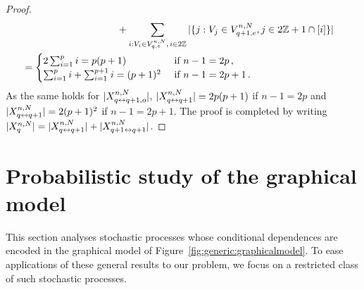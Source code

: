 \begin{proof}
\begin{align*}
&\hspace{3cm}+\sum_{i : V_i\in V_{q,e}^{n,N},\,i\in 2\bZ}|\{j: V_j\in V_{q+1,e}^{n,N},j\in 2\bZ+1\cap [i]\}|\\
&\hspace{-.37cm}=
\begin{cases}
2\sum_{i=1}^pi=p(p+1) &\text{ if }n-1=2p\eqsp,\\
\sum_{i=1}^pi+\sum_{i=1}^{p+1}i=(p+1)^2 &\text{ if }n-1=2p+1\eqsp.
\end{cases}
\end{align*}
As the same holds for $|X_{q\leftrightarrow q+1,o}^{n,N}|$, $|X_{q\leftrightarrow q+1}^{n,N}| = 2p(p+1)$ if $n-1=2p$ and $|X_{q\leftrightarrow q+1}^{n,N}| = 2(p+1)^2$ if $n-1=2p+1$. The proof is completed by writing $|X_{q}^{n,N}| = |X_{q\leftrightarrow q+1}^{n,N}|  + |X_{q+1\leftrightarrow q+1}^{n,N}|$.
\end{proof}


\section{Probabilistic study of the graphical model}\label{sec:ProbTools}
This section analyses stochastic processes whose conditional dependences are encoded in the graphical model of Figure~\ref{fig:generic:graphicalmodel}. To ease applications of these general results to our problem, we focus on a restricted class of such stochastic processes.


